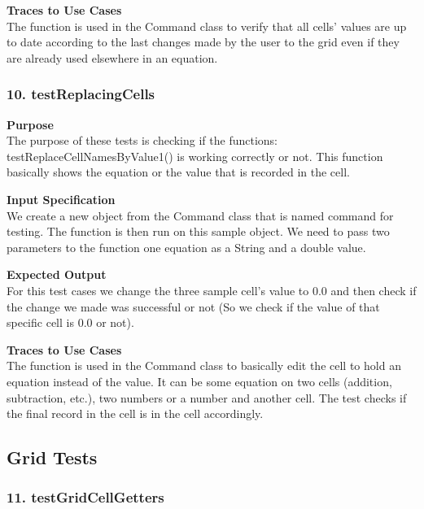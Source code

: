 \documentclass[12pt]{article}
\begin{document}
\noindent
{\bf Traces to Use Cases}\\
The function is used in the Command class to verify that all cells’ values are up to date according to the last changes made by the user to the grid even if they are already used elsewhere in an equation.

\subsubsection{10. testReplacingCells} \label{tc:1}

\noindent
{\bf Purpose}\\
The purpose of these tests is checking if the functions: testReplaceCellNamesByValue1() is working correctly or not. This function basically shows the equation or the value that is recorded in the cell. 

\noindent
{\bf Input Specification}\\
We create a new object from the Command class that is named command for testing. The function is then run on this sample object. We need to pass two parameters to the function one equation as a String and a double value. 

\noindent
{\bf Expected Output}\\
For this test cases we change the three sample cell’s value to 0.0 and then check if the change we made was successful or not (So we check if the value of that specific cell is 0.0 or not).

\noindent
{\bf Traces to Use Cases}\\
The function is used in the Command class to basically edit the cell to hold an equation instead of the value. It can be some equation on two cells (addition, subtraction, etc.), two numbers or a number and another cell. The test checks if the final record in the cell is in the cell accordingly.  

\subsection{Grid Tests}
\subsubsection{11. testGridCellGetters} \label{tc:1}
\end{document}
